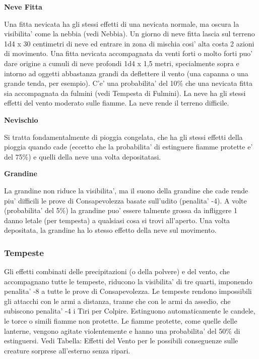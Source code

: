 \documentclass[a4paper,11pt,twoside,openany]{book}
\begin{document}
{\textbf{Neve Fitta}

Una fitta nevicata ha gli stessi effetti di una nevicata normale, ma oscura la visibilita' come la nebbia (vedi Nebbia). Un giorno di neve fitta lascia sul terreno 1d4 x 30 centimetri di neve ed entrare in zona di mischia cosi' alta costa 2 azioni di movimento. Una fitta nevicata accompagnata da venti forti o molto forti puo' dare origine a cumuli di neve profondi 1d4 x 1,5 metri, specialmente sopra e intorno ad oggetti abbastanza grandi da deflettere il vento (una capanna o una grande tenda, per esempio).
C'e' una probabilita' del 10\% che una nevicata fitta sia accompagnata da fulmini (vedi Tempesta di Fulmini). La neve ha gli stessi effetti del vento moderato sulle fiamme. La neve rende il terreno difficile.

\textbf{Nevischio}

Si tratta fondamentalmente di pioggia congelata, che ha gli stessi effetti della pioggia quando cade (eccetto che la probabilita' di estinguere fiamme protette e' del 75\%) e quelli della neve una volta depositatasi.

\textbf{Grandine}

La grandine non riduce la visibilita', ma il suono della grandine che cade rende piu' difficili le prove di Consapevolezza basate sull'udito (penalita' -4). A volte (probabilita' del 5\%) la grandine puo' essere talmente grossa da infliggere 1 danno letale (per tempesta) a qualsiasi cosa si trovi all'aperto. Una volta depositata, la grandine ha lo stesso effetto della neve sul movimento.

\subsubsection{Tempeste}

\label{tempeste}

Gli effetti combinati delle precipitazioni (o della polvere) e del vento, che accompagnano tutte le tempeste, riducono la visibilita' di tre quarti, imponendo penalita' -8 a tutte le prove di Consapevolezza. Le tempeste rendono impossibili gli attacchi con le armi a distanza, tranne che con le armi da assedio, che subiscono penalita' -4 i Tiri per Colpire.
Estinguono automaticamente le candele, le torce o simili fiamme non protette. Le fiamme protette, come quelle delle lanterne, vengono agitate violentemente e hanno una probabilita' del 50\% di estinguersi. Vedi Tabella: Effetti del Vento per le possibili conseguenze sulle creature sorprese all'esterno senza ripari. 

}
\end{document}
